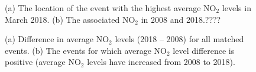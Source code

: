 \documentclass[a4paper,11pt]{article}
\begin{document}
\begin{figure}[!htb]
	\centering
 \caption{(a) The location of the event with the highest average $\text{NO}_2$ levels in March 2018. (b) The associated $\text{NO}_2$ in 2008 and 2018.????}
\end{figure}
\begin{figure}[!htb]
  \centering
  \caption{(a) Difference in average $\text{NO}_2$ levels (2018 -- 2008) for all matched events. (b) The events for which average $\text{NO}_2$ level difference is positive (average $\text{NO}_2$ levels have increased from 2008 to 2018).}
  \label{fig:DifferenceInNO2Levels}
\end{figure}
\end{document}
